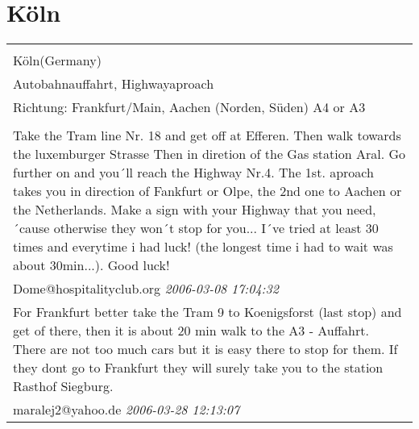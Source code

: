 \documentclass[a4paper,12pt]{article}
\begin{document}
\section{Köln}
\begin{tabular}{|p{13cm}|}
\hline\\
Köln(Germany)\\
Autobahnauffahrt, Highwayaproach\\
Richtung: Frankfurt/Main, Aachen (Norden, Süden) A4 or A3 \\
\hline\\
Take the Tram line Nr. 18 and get off at Efferen. Then walk towards the luxemburger Strasse Then in diretion of the Gas station Aral. Go further on and you´ll reach the Highway Nr.4. The 1st. aproach takes you in direction of Fankfurt or Olpe, the 2nd one to Aachen or the Netherlands.
Make a sign with your Highway that you need, ´cause otherwise they won´t stop for you...
I´ve tried at least 30 times and everytime i had luck! (the longest time i had to wait was about 30min...).
Good luck! \\
Dome@hospitalityclub.org \textit{ 2006-03-08 17:04:32 }\\\hline For Frankfurt better take the Tram 9 to Koenigsforst (last stop) and get of there, then it is about 20 min walk to the A3 - Auffahrt. There are not too much cars but it is easy there to stop for them. If they dont go to Frankfurt they will surely take you to the station Rasthof Siegburg. \\
maralej2@yahoo.de \textit{ 2006-03-28 12:13:07 }\\\hline
\end{tabular}
\end{document}
